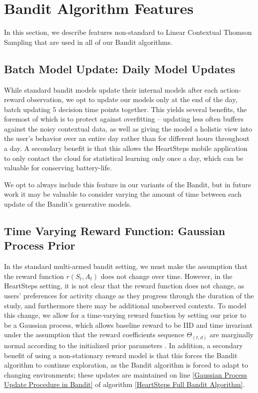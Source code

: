 \section{Bandit Algorithm Features}
\label{Models/Bandit Algorithm Features}

In this section, we describe features non-standard to Linear Contextual Thomson Sampling that are used in all of our Bandit algorithms.

\subsection{Batch Model Update: Daily Model Updates}

While standard bandit models update their internal models after each action-reward observation, we opt to update our models only at the end of the day, batch updating $5$ decision time points together.  This yields several benefits, the foremost of which is to protect against overfitting -- updating less often buffers against the noisy contextual data, as well as giving the model a holistic view into the user's behavior over an entire day rather than for different hours throughout a day.  A secondary benefit is that this allows the HeartSteps mobile application to only contact the cloud for statistical learning only once a day, which can be valuable for conserving battery-life.

We opt to always include this feature in our variants of the Bandit, but in future work it may be valuable to consider varying the amount of time between each update of the Bandit's generative models.

\subsection{Time Varying Reward Function: Gaussian Process Prior}

In the standard multi-armed bandit setting, we must make the assumption that the reward function $r(S_t,A_t)$ does not change over time.  However, in the HeartSteps setting, it is not clear that the reward function does not change, as users' preferences for activity change as they progress through the duration of the study, and furthermore there may be additional unobserved contexts.  To model this change, we allow for a time-varying reward function by setting our prior to be a Gaussian process, which allows baseline reward to be IID and time invariant under the assumption that the reward coefficients sequence $\Theta_{(t,d)}$ are marginally normal according to the initialized prior parameters \citep{Greenewald2017}.  In addition, a secondary benefit of using a non-stationary reward model is that this forces the Bandit algorithm to continue exploration, as the Bandit algorithm is forced to adapt to changing environments; these updates are maintained on line \ref{Gaussian Process Update Procedure in Bandit} of algorithm \ref{HeartSteps Full Bandit Algorithm}.  \\


